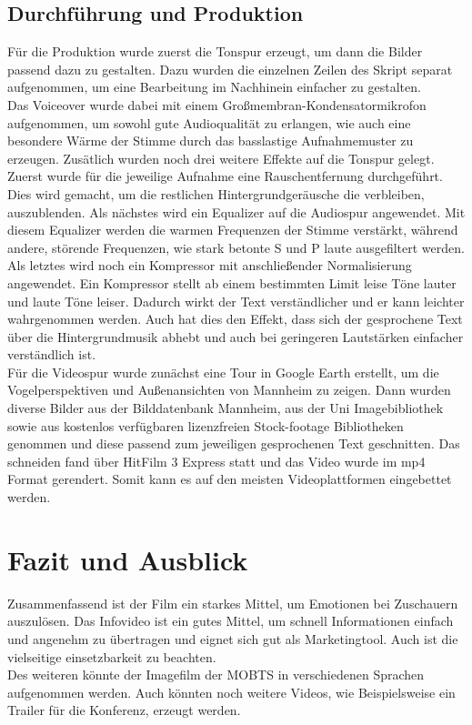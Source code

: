 \subsection{Durchführung und Produktion}
Für die Produktion wurde zuerst die Tonspur erzeugt, um dann die Bilder passend dazu zu gestalten. Dazu wurden die einzelnen Zeilen des Skript separat aufgenommen, um eine Bearbeitung im Nachhinein einfacher zu gestalten.\\
Das Voiceover wurde dabei mit einem Großmembran-Kondensatormikrofon aufgenommen, um sowohl gute Audioqualität zu erlangen, wie auch eine besondere Wärme der Stimme durch das basslastige Aufnahmemuster zu erzeugen. Zusätlich wurden noch drei weitere Effekte auf die Tonspur gelegt. Zuerst wurde für die jeweilige Aufnahme eine Rauschentfernung durchgeführt. Dies wird gemacht, um die restlichen Hintergrundgeräusche die verbleiben, auszublenden. Als nächstes wird ein Equalizer auf die Audiospur angewendet. Mit diesem Equalizer werden die warmen Frequenzen der Stimme verstärkt, während andere, störende Frequenzen, wie stark betonte S und P laute ausgefiltert werden. Als letztes wird noch ein Kompressor mit anschließender Normalisierung angewendet. Ein Kompressor stellt ab einem bestimmten Limit leise Töne lauter und laute Töne leiser. Dadurch wirkt der Text verständlicher und er kann leichter wahrgenommen werden. Auch hat dies den Effekt, dass sich der gesprochene Text über die Hintergrundmusik abhebt und auch bei geringeren Lautstärken einfacher verständlich ist.\\
Für die Videospur wurde zunächst eine Tour in Google Earth erstellt, um die Vogelperspektiven und Außenansichten von Mannheim zu zeigen. Dann wurden diverse Bilder aus der Bilddatenbank Mannheim, aus der Uni Imagebibliothek sowie aus kostenlos verfügbaren lizenzfreien Stock-footage Bibliotheken genommen und diese passend zum jeweiligen gesprochenen Text geschnitten. Das schneiden fand über HitFilm 3 Express statt und das Video wurde im mp4 Format gerendert. Somit kann es auf den meisten Videoplattformen eingebettet werden.
\section{Fazit und Ausblick}
Zusammenfassend ist der Film ein starkes Mittel, um Emotionen bei Zuschauern auszulösen. Das Infovideo ist ein gutes Mittel, um schnell Informationen einfach und angenehm zu übertragen und eignet sich gut als Marketingtool. Auch ist die vielseitige einsetzbarkeit zu beachten.\\
Des weiteren könnte der Imagefilm der \ac{MOBTS} in verschiedenen Sprachen aufgenommen werden. Auch könnten noch weitere Videos, wie Beispielsweise ein Trailer für die Konferenz, erzeugt werden.